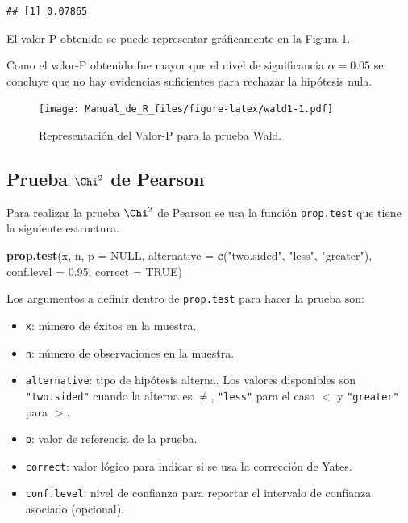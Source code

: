 \documentclass[10pt,]{krantz}
\makeatletter
\newenvironment{Shaded}{\begin{snugshade}}{\end{snugshade}}
\newcommand{\KeywordTok}[1]{\textcolor[rgb]{0.13,0.29,0.53}{\textbf{#1}}}
\newcommand{\DataTypeTok}[1]{\textcolor[rgb]{0.13,0.29,0.53}{#1}}
\newcommand{\FloatTok}[1]{\textcolor[rgb]{0.00,0.00,0.81}{#1}}
\newcommand{\StringTok}[1]{\textcolor[rgb]{0.31,0.60,0.02}{#1}}
\newcommand{\OtherTok}[1]{\textcolor[rgb]{0.56,0.35,0.01}{#1}}
\newcommand{\NormalTok}[1]{#1}
\providecommand{\tightlist}{%
  \setlength{\itemsep}{0pt}\setlength{\parskip}{0pt}}
\newenvironment{kframe}{%
\medskip{}
\setlength{\fboxsep}{.8em}
 \def\at@end@of@kframe{}%
 \ifinner\ifhmode%
  \def\at@end@of@kframe{\end{minipage}}%
  \begin{minipage}{\columnwidth}%
 \fi\fi%
 \def\FrameCommand##1{\hskip\@totalleftmargin \hskip-\fboxsep
 \colorbox{shadecolor}{##1}\hskip-\fboxsep
     \hskip-\linewidth \hskip-\@totalleftmargin \hskip\columnwidth}%
 \MakeFramed {\advance\hsize-\width
   \@totalleftmargin\z@ \linewidth\hsize
   \@setminipage}}%
 {\par\unskip\endMakeFramed%
 \at@end@of@kframe}
\renewenvironment{Shaded}{\begin{kframe}}{\end{kframe}}
\makeatother
\begin{document}
\begin{verbatim}
## [1] 0.07865
\end{verbatim}

El valor-P obtenido se puede representar gráficamente en la Figura
\ref{fig:wald1}.

Como el valor-P obtenido fue mayor que el nivel de significancia
\(\alpha=0.05\) se concluye que no hay evidencias suficientes para
rechazar la hipótesis nula.

\begin{figure}
\centering
\texttt{[image: Manual\_de\_R\_files/figure-latex/wald1-1.pdf]}
\caption{\label{fig:wald1}Representación del Valor-P para la prueba Wald.}
\end{figure}

\newpage

\subsection{\texorpdfstring{Prueba \(\Chi^2\) de
Pearson}{Prueba \textbackslash{}Chi\^{}2 de Pearson}}\label{prueba-chi2-de-pearson}

Para realizar la prueba \(\Chi^2\) de Pearson se usa la función
\texttt{prop.test} que tiene la siguiente estructura.

\begin{Shaded}
\begin{Highlighting}[]
\KeywordTok{prop.test}\NormalTok{(x, n, }\DataTypeTok{p =} \OtherTok{NULL}\NormalTok{,}
          \DataTypeTok{alternative =} \KeywordTok{c}\NormalTok{(}\StringTok{"two.sided"}\NormalTok{, }\StringTok{"less"}\NormalTok{, }\StringTok{"greater"}\NormalTok{),}
          \DataTypeTok{conf.level =} \FloatTok{0.95}\NormalTok{, }\DataTypeTok{correct =} \OtherTok{TRUE}\NormalTok{)}
\end{Highlighting}
\end{Shaded}

Los argumentos a definir dentro de \texttt{prop.test} para hacer la
prueba son:

\begin{itemize}
\tightlist
\item
  \texttt{x}: número de éxitos en la muestra.
\item
  \texttt{n}: número de observaciones en la muestra.
\item
  \texttt{alternative}: tipo de hipótesis alterna. Los valores
  disponibles son \texttt{"two.sided"} cuando la alterna es \(\neq\),
  \texttt{"less"} para el caso \(<\) y \texttt{"greater"} para \(>\).
\item
  \texttt{p}: valor de referencia de la prueba.
\item
  \texttt{correct}: valor lógico para indicar si se usa la corrección de
  Yates.
\item
  \texttt{conf.level}: nivel de confianza para reportar el intervalo de
  confianza asociado (opcional).
\end{itemize}
\end{document}
